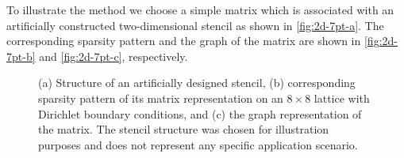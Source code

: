 To illustrate the method we choose a
simple matrix which is associated with an artificially constructed
two-dimensional stencil as shown in \cref{fig:2d-7pt-a}. The
corresponding sparsity pattern and the graph of the matrix are shown
in \cref{fig:2d-7pt-b} and \cref{fig:2d-7pt-c}, respectively.
\begin{figure}[tbp]
	\centering
	\hspace{0.8em}
	\hspace{1em}
	\caption{(a) Structure of an artificially designed stencil,
	(b) corresponding sparsity pattern of its matrix
	representation on an $8\times 8$ lattice with Dirichlet
	boundary conditions, and (c) the graph representation of the
	matrix. The stencil
	structure was chosen for illustration purposes and does not
	represent any specific application scenario.}
	\label{fig:2d-7pt}
\end{figure}

